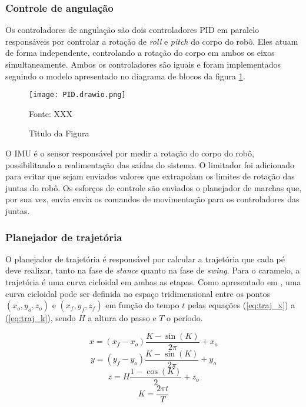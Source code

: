 \documentclass[../main.tex]{subfiles}
\begin{document}
\subsubsection{Controle de angulação}

Os controladores de angulação são dois controladores PID em paralelo responsáveis por controlar a rotação de \textit{roll} e \textit{pitch} do corpo do robô. Eles atuam de forma independente, controlando a rotação do corpo em ambos os eixos simultaneamente. Ambos os controladores são iguais e foram implementados seguindo o modelo apresentado no diagrama de blocos da figura \ref{fig:pid}.

\begin{figure}[h]
  \centering
  \caption{Titulo da Figura}
  \texttt{[image: PID.drawio.png]}

  Fonte: XXX
  \label{fig:pid}
\end{figure}

O IMU é o sensor responsável por medir a rotação do corpo do robô, possibilitando a realimentação das saídas do sistema. O limitador foi adicionado para evitar que sejam enviados valores que extrapolam os limites de rotação das juntas do robô. Os esforços de controle são enviados o planejador de marchas que, por sua vez, envia envia os comandos de movimentação para os controladores das juntas. 

\subsubsection{Planejador de trajetória}

O planejador de trajetória é responsável por calcular a trajetória que cada pé deve realizar, tanto na fase de \textit{stance} quanto na fase de \textit{swing}. Para o caramelo, a trajetória é uma curva cicloidal em ambas as etapas. Como apresentado em \cite{Shi2021}, uma curva cicloidal pode ser definida no espaço tridimensional entre os pontos $(x_o, y_o, z_o)$ e $(x_f, y_f, z_f)$ em função do tempo $t$ pelas equações (\ref{eq:traj_x}) a (\ref{eq:traj_k}), sendo $H$ a altura do passo e $T$ o período.

\begin{equation}
  x = (x_f - x_o) \frac{K - \sin{(K)}}{2 \pi} + x_o
  \label{eq:traj_x}
\end{equation}
\begin{equation}
  y = (y_f - y_o) \frac{K - \sin{(K)}}{2 \pi} + y_o
  \label{eq:traj_y}
\end{equation}
\begin{equation}
  z = H \frac{1 - \cos{(K)}}{2} + z_o
  \label{eq:traj_z}
\end{equation}
\begin{equation}
  K = \frac{2 \pi t}{T}
  \label{eq:traj_k}
\end{equation}
\end{document}
